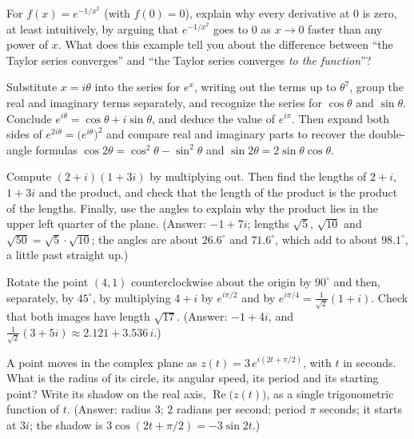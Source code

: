 \begin{exercise}
For $f(x) = e^{-1/x^2}$ (with $f(0)=0$), explain why every derivative at $0$ is zero, at least intuitively, by arguing that $e^{-1/x^2}$ goes to $0$ as $x\to 0$ faster than any power of $x$. What does this example tell you about the difference between ``the Taylor series converges'' and ``the Taylor series converges \emph{to the function}''?
\end{exercise}

\begin{exercise}
Substitute $x = i\theta$ into the series for $e^x$, writing out the terms up to $\theta^7$, group the real and imaginary terms separately, and recognize the series for $\cos\theta$ and $\sin\theta$. Conclude $e^{i\theta} = \cos\theta + i\sin\theta$, and deduce the value of $e^{i\pi}$. Then expand both sides of $e^{2i\theta} = \bigl(e^{i\theta}\bigr)^2$ and compare real and imaginary parts to recover the double-angle formulas $\cos 2\theta = \cos^2\theta - \sin^2\theta$ and $\sin 2\theta = 2\sin\theta\cos\theta$.
\end{exercise}

\begin{exercise}
Compute $(2+i)(1+3i)$ by multiplying out. Then find the lengths of $2+i$, $1+3i$ and the product, and check that the length of the product is the product of the lengths. Finally, use the angles to explain why the product lies in the upper left quarter of the plane. (Answer: $-1+7i$; lengths $\sqrt5$, $\sqrt{10}$ and $\sqrt{50} = \sqrt5\cdot\sqrt{10}$; the angles are about $26.6^\circ$ and $71.6^\circ$, which add to about $98.1^\circ$, a little past straight up.)
\end{exercise}

\begin{exercise}
Rotate the point $(4, 1)$ counterclockwise about the origin by $90^\circ$ and then, separately, by $45^\circ$, by multiplying $4 + i$ by $e^{i\pi/2}$ and by $e^{i\pi/4} = \frac{1}{\sqrt2}(1+i)$. Check that both images have length $\sqrt{17}$. (Answer: $-1 + 4i$, and $\frac{1}{\sqrt2}(3 + 5i) \approx 2.121 + 3.536\,i$.)
\end{exercise}

\begin{exercise}
A point moves in the complex plane as $z(t) = 3\,e^{i(2t + \pi/2)}$, with $t$ in seconds. What is the radius of its circle, its angular speed, its period and its starting point? Write its shadow on the real axis, $\operatorname{Re}\bigl(z(t)\bigr)$, as a single trigonometric function of $t$. (Answer: radius $3$; $2$ radians per second; period $\pi$ seconds; it starts at $3i$; the shadow is $3\cos(2t + \pi/2) = -3\sin 2t$.)
\end{exercise}

